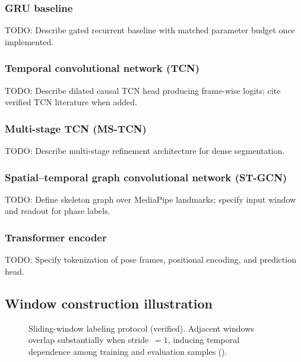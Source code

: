 \subsubsection{GRU baseline}
\label{sec:methods:gru}
\textsc{TODO:} Describe gated recurrent baseline with matched parameter budget once implemented.

\subsubsection{Temporal convolutional network (TCN)}
\label{sec:methods:tcn}
\textsc{TODO:} Describe dilated causal TCN head producing frame-wise logits; cite verified \acs{TCN} literature when added.

\subsubsection{Multi-stage TCN (MS-TCN)}
\label{sec:methods:mstcn}
\textsc{TODO:} Describe multi-stage refinement architecture for dense segmentation.

\subsubsection{Spatial--temporal graph convolutional network (ST-GCN)}
\label{sec:methods:stgcn}
\textsc{TODO:} Define skeleton graph over MediaPipe landmarks; specify input window and readout for phase labels.

\subsubsection{Transformer encoder}
\label{sec:methods:transformer}
\textsc{TODO:} Specify tokenization of pose frames, positional encoding, and prediction head.

\subsection{Window construction illustration}
\label{sec:methods:windows}

\begin{figure}[t]
  \centering
  \caption{Sliding-window labeling protocol (verified). Adjacent windows overlap substantially when stride~$=1$, inducing temporal dependence among training and evaluation samples ().}
  \label{fig:window_construction}
\end{figure}
